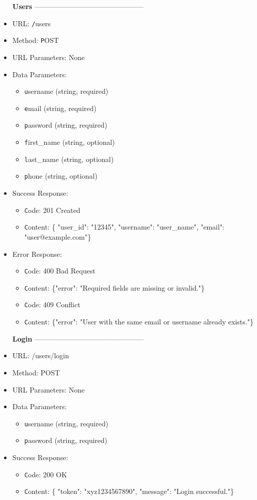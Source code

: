 \begin{itemize}
\item[\textbf{Users}] -----------------------------------------------

\item URL: \texttt /users  
\item Method: \texttt POST  
\item URL Parameters: None
\item Data Parameters: 
\begin{itemize}  
  \item \texttt username   (string, required)
  \item \texttt email   (string, required)
  \item \texttt password   (string, required)
  \item \texttt first\_name   (string, optional)
  \item \texttt last\_name   (string, optional)
  \item \texttt phone   (string, optional)
\end{itemize}  
\item Success Response:
\begin{itemize}  
  \item \texttt Code: 201 Created  
  \item \texttt Content: \{ "user\_id": "12345",
    "username": "user\_name",
    "email": "user@example.com"\} 

\end{itemize}  
\item Error Response:
\begin{itemize}  
  \item \texttt Code: 400 Bad Request  
  \item \texttt Content: \{"error": "Required fields are missing or invalid."\}
  \item \texttt Code: 409 Conflict  
  \item \texttt Content:  \{"error": "User with the same email or username already exists."\}
     
\end{itemize}  

\item[\textbf{Login}] -----------------------------------------------

\item URL: /users/login  
\item Method:  POST  
\item URL Parameters: None
\item Data Parameters: 
\begin{itemize}
  \item \texttt username   (string, required)
  \item \texttt password   (string, required)
\end{itemize}  
\item Success Response:
\begin{itemize}  
  \item \texttt Code: 200 OK  
  \item \texttt Content: \{ "token": "xyz1234567890",
    "message": "Login successful."\}
     

\end{itemize}
\end{itemize}
